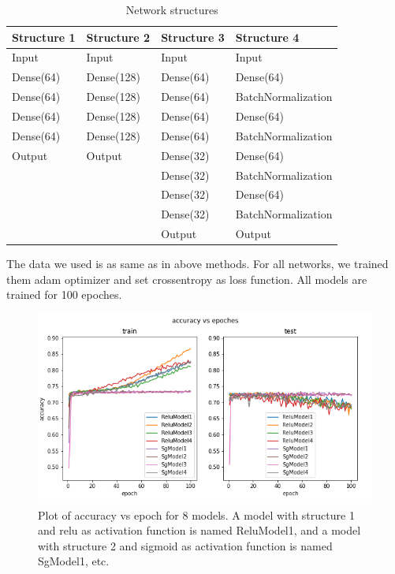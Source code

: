 \documentclass{article}
\begin{document}
\begin{table}[h!]
\caption{Network structures}
\centering
\begin{tabular}{ |p{2cm}|p{2cm}|p{2cm}|p{3.2cm}|  }
\hline
Structure 1& Structure 2 &Structure 3 & Structure 4 \\
\hline
Input & Input & Input & Input \\
Dense(64) & Dense(128) & Dense(64) & Dense(64) \\
Dense(64) & Dense(128) & Dense(64) & BatchNormalization \\
Dense(64) & Dense(128) & Dense(64) & Dense(64) \\
Dense(64) & Dense(128) & Dense(64) & BatchNormalization \\
Output & Output & Dense(32) & Dense(64) \\
 &  & Dense(32) & BatchNormalization \\
 &  & Dense(32) & Dense(64) \\
 &  & Dense(32) & BatchNormalization \\
 &  & Output & Output \\
\hline
\end{tabular}
\end{table}

The data we used is as same as in above methods. For all networks, we trained them adam optimizer and set crossentropy as loss function. All models are trained for 100 epoches.

\begin{figure}[h!]
\centering
\includegraphics[scale=0.8]{accuracy.png}
\caption{Plot of accuracy vs epoch for 8 models. A model with structure 1 and relu as activation function is named ReluModel1, and a model with structure 2 and sigmoid as activation function is named SgModel1, etc.}
\label{fig:universe}
\end{figure}
\end{document}
